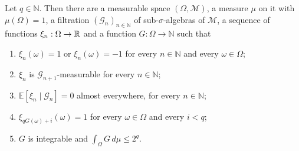 \begin{helper}
Let $q\in\mathbb N$. Then there are a measurable space $(\Omega,\mathcal M)$, a
measure $\mu$ on it with $\mu(\Omega)=1$, a filtration
$(\mathcal G_n)_{n\in\mathbb N}$ of sub-$\sigma$-algebras of $\mathcal M$, a
sequence of functions $\xi_n:\Omega\to\mathbb{R}$ and a function
$G:\Omega\to\mathbb N$ such that
\begin{enumerate}
\item $\xi_n(\omega)=1$ or $\xi_n(\omega)=-1$ for every $n\in\mathbb N$ and
  every $\omega\in\Omega$;
\item $\xi_n$ is $\mathcal G_{n+1}$-measurable for every $n\in\mathbb N$;
\item $\mathbb E[\xi_n\mid\mathcal G_n]=0$ almost everywhere, for every
  $n\in\mathbb N$;
\item $\xi_{qG(\omega)+i}(\omega)=1$ for every $\omega\in\Omega$ and every
  $i<q$;
\item $G$ is integrable and $\int_\Omega G\,d\mu\le2^q$.
\end{enumerate}
\end{helper}
